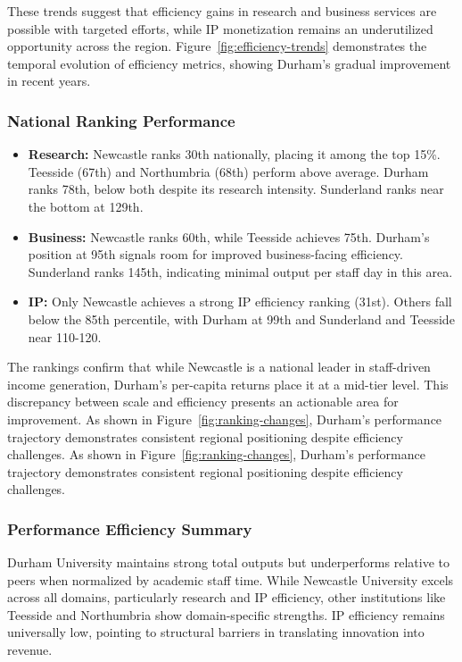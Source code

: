 \documentclass[journal,onecolumn, 10pt,draftclsnofoot]{IEEEtran}
\begin{document}
These trends suggest that efficiency gains in research and business services are possible with targeted efforts, while IP monetization remains an underutilized opportunity across the region. Figure~\ref{fig:efficiency-trends} demonstrates the temporal evolution of efficiency metrics, showing Durham's gradual improvement in recent years.

\subsubsection{National Ranking Performance}

\begin{itemize}
    \item \textbf{Research:} Newcastle ranks 30th nationally, placing it among the top 15\%. Teesside (67th) and Northumbria (68th) perform above average. Durham ranks 78th, below both despite its research intensity. Sunderland ranks near the bottom at 129th.
    
    \item \textbf{Business:} Newcastle ranks 60th, while Teesside achieves 75th. Durham's position at 95th signals room for improved business-facing efficiency. Sunderland ranks 145th, indicating minimal output per staff day in this area.
    
    \item \textbf{IP:} Only Newcastle achieves a strong IP efficiency ranking (31st). Others fall below the 85th percentile, with Durham at 99th and Sunderland and Teesside near 110-120.
\end{itemize}

The rankings confirm that while Newcastle is a national leader in staff-driven income generation, Durham's per-capita returns place it at a mid-tier level. This discrepancy between scale and efficiency presents an actionable area for improvement. As shown in Figure~\ref{fig:ranking-changes}, Durham's performance trajectory demonstrates consistent regional positioning despite efficiency challenges. As shown in Figure~\ref{fig:ranking-changes}, Durham's performance trajectory demonstrates consistent regional positioning despite efficiency challenges.

\subsubsection{Performance Efficiency Summary}

Durham University maintains strong total outputs but underperforms relative to peers when normalized by academic staff time. While Newcastle University excels across all domains, particularly research and IP efficiency, other institutions like Teesside and Northumbria show domain-specific strengths. IP efficiency remains universally low, pointing to structural barriers in translating innovation into revenue.
\end{document}

